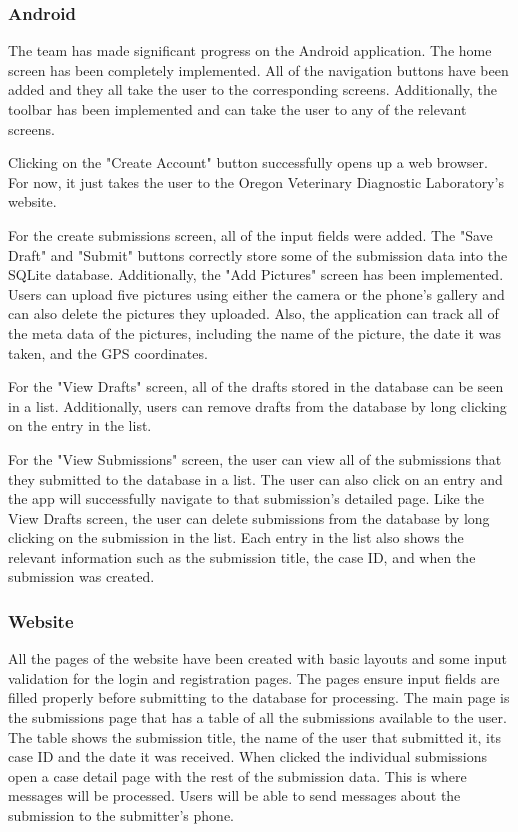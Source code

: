 \documentclass[onecolumn, draftclsnofoot,10pt, compsoc]{IEEEtran}
\begin{document}
\subsubsection{Android}
The team has made significant progress on the Android application. The home screen has been completely implemented. All of the navigation buttons have been added and they all take the user to the corresponding screens. Additionally, the toolbar has been implemented and can take the user to any of the relevant screens.

Clicking on the "Create Account" button successfully opens up a web browser. For now, it just takes the user to the Oregon Veterinary Diagnostic Laboratory's website.

For the create submissions screen, all of the input fields were added. The "Save Draft" and "Submit" buttons correctly store some of the submission data into the SQLite database. Additionally, the "Add Pictures" screen has been implemented. Users can upload five pictures using either the camera or the phone's gallery and can also delete the pictures they uploaded. Also, the application can track all of the meta data of the pictures, including the name of the picture, the date it was taken, and the GPS coordinates. 

For the "View Drafts" screen, all of the drafts stored in the database can be seen in a list. Additionally, users can remove drafts from the database by long clicking on the entry in the list.

For the "View Submissions" screen, the user can view all of the submissions that they submitted to the database in a list. The user can also click on an entry and the app will successfully navigate to that submission's detailed page. Like the View Drafts screen, the user can delete submissions from the database by long clicking on the submission in the list. Each entry in the list also shows the relevant information such as the submission title, the case ID, and when the submission was created.

\subsubsection{Website}
All the pages of the website have been created with basic layouts and some input validation for the login and registration pages. The pages ensure input fields are filled properly before submitting to the database for processing. The main page is the submissions page that has a table of all the submissions available to the user. The table shows the submission title, the name of the user that submitted it, its case ID and the date it was received. When clicked the individual submissions open a case detail page with the rest of the submission data. This is where messages will be processed. Users will be able to send messages about the submission to the submitter's phone. 
\end{document}
